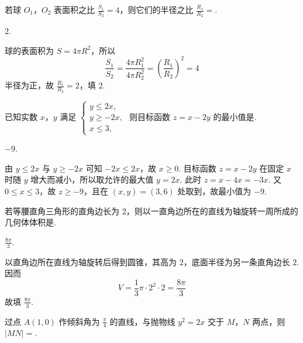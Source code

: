 \begin{problem}
若球 \(O_1\)，\(O_2\) 表面积之比 \(\frac{S_1}{S_2} = 4\)，则它们的半径之比 \(\frac{R_1}{R_2} =\)\fillinblank{}.
\end{problem}

\begin{answer}
\(2\).
\end{answer}

\begin{solution}
球的表面积为 \(S=4\pi R^2\)，所以
\[
\frac{S_1}{S_2}=\frac{4\pi R_1^2}{4\pi R_2^2}=\left(\frac{R_1}{R_2}\right)^2=4
\]
半径为正，故 \(\frac{R_1}{R_2}=2\)，填 \(2\).
\end{solution}

\begin{problem}
已知实数 \(x\)，\(y\) 满足 \(\begin{cases}
y \leqslant 2x,\\
y \geqslant -2x,\\
x \leqslant 3,
\end{cases}\) 则目标函数 \(z = x - 2y\) 的最小值是\fillinblank{}.
\end{problem}

\begin{answer}
\(-9\).
\end{answer}

\begin{solution}
由 \(y\leqslant2x\) 与 \(y\geqslant-2x\) 可知 \(-2x\leqslant2x\)，故 \(x\geqslant0\). 目标函数 \(z=x-2y\) 在固定 \(x\) 时随 \(y\) 增大而减小，所以取允许的最大值 \(y=2x\). 此时 \(z=x-4x=-3x\). 又 \(0\leqslant x\leqslant3\)，故 \(z\geqslant-9\)，且在 \((x,y)=(3,6)\) 处取到，故最小值为 \(-9\).
\end{solution}

\begin{problem}
若等腰直角三角形的直角边长为 \(2\)，则以一直角边所在的直线为轴旋转一周所成的几何体体积是\fillinblank{}.
\end{problem}

\begin{answer}
\(\frac{8\pi}{3}\).
\end{answer}

\begin{solution}
以直角边所在直线为轴旋转后得到圆锥，其高为 \(2\)，底面半径为另一条直角边长 \(2\). 因而
\[
V=\frac13\pi\cdot2^2\cdot2=\frac{8\pi}{3}
\]
故填 \(\frac{8\pi}{3}\).
\end{solution}

\begin{problem}
过点 \(A(1, 0)\) 作倾斜角为 \(\frac{\pi}{4}\) 的直线，与抛物线 \(y^2 = 2x\) 交于 \(M\)，\(N\) 两点，则 \(|MN| =\)\fillinblank{}.
\end{problem}

